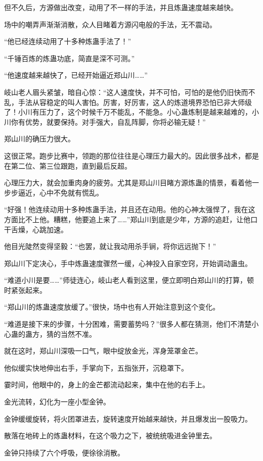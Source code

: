\begin{this_body}
但不久后，方源做出改变，动用了不一样的手法，并且炼蛊速度越来越快。

场中的嘲弄声渐渐消散，众人目睹着方源闪电般的手法，无不震动。

“他已经连续动用了十多种炼蛊手法了！”

“千锤百炼的炼蛊功底，简直是深不可测。”

“他速度越来越快了，已经开始逼近郑山川……”

岐山老人眉头紧皱，暗自心惊：“这人速度快，并不可怕，可怕的是他仍旧快而不乱，手法从容稳定的叫人害怕。厉害，好厉害，这人的炼道境界恐怕已非大师级了！小川有压力了，这个时候千万不能乱，不能急。小心蛊炼制是越来越难的，小川你有优势，就要保持。对手强大，自乱阵脚，你将必输无疑！”

郑山川的确压力很大。

这很正常。跑步比赛中，领跑的那位往往是心理压力最大的。因此很多战术，都是在第二位、第三位跟跑，直到最后反超。

心理压力大，就会加重肉身的疲劳。尤其是郑山川目睹方源炼蛊的情景，看着他一步步逼近，心中不免就有慌乱。

“好强！他连续动用十多种炼蛊手法，并且还在动用。他的心神太强悍了，我在这方面比不上他。糟糕，他要追上来了……”郑山川到底是少年，方源的追赶，让他口干舌燥，心跳加速。

他目光陡然变得坚毅：“也罢，就让我动用杀手锏，将你远远抛下！”

郑山川下定决心，手中炼蛊速度骤然一缓，心神投入自家空窍，开始调动蛊虫。

“难道小川是要……”师徒连心，岐山老人看到这里，便立即明白郑山川的打算，顿时紧张起来。

“郑山川的炼蛊速度放缓了。”很快，场中也有人开始注意到这个变化。

“难道是接下来的步骤，十分困难，需要蓄势吗？”很多人都在猜测，他们不清楚小心蛊的蛊方，猜的当然不准。

就在这时，郑山川深吸一口气，眼中绽放金光，浑身笼罩金芒。

他似缓实快地伸出右手，手掌向下，五指张开，沉稳罩下。

霎时间，他眼中的，身上的金芒都流动起来，集中在他的右手上。

金光流转，幻化为一座小型金钟。

金钟缓缓旋转，将火团罩进去，旋转速度开始越来越快，并且爆发出一股吸力。

散落在地砖上的炼蛊材料，在这个吸力之下，被统统吸进金钟里去。

金钟只持续了六个呼吸，便徐徐消散。


\end{this_body}
